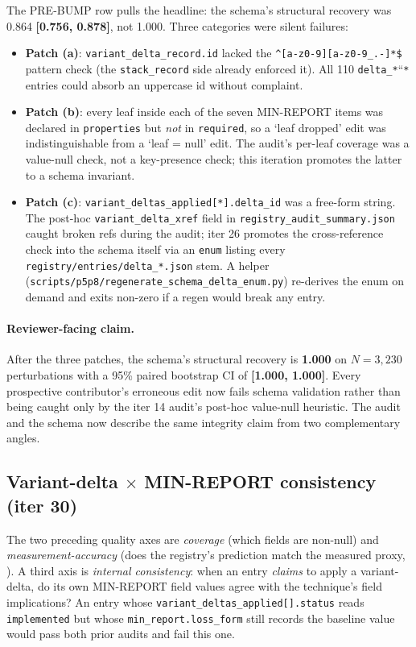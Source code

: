 The PRE-BUMP row pulls the headline: the schema's structural
recovery was 0.864 \textbf{[0.756, 0.878]}, not 1.000. Three
categories were silent failures:

\begin{itemize}
\item \textbf{Patch (a)}: \texttt{variant\_delta\_record.id} lacked
the \verb|^[a-z0-9][a-z0-9_.-]*$| pattern check (the
\texttt{stack\_record} side already enforced it). All 110
\texttt{delta\_*}``\texttt{*} entries could absorb an uppercase id
without complaint.
\item \textbf{Patch (b)}: every leaf inside each of the seven
MIN-REPORT items was declared in \texttt{properties} but \emph{not} in
\texttt{required}, so a `leaf dropped' edit was indistinguishable from
a `leaf = null' edit. The audit's per-leaf coverage was a value-null
check, not a key-presence check; this iteration promotes the latter to a
schema invariant.
\item \textbf{Patch (c)}:
\texttt{variant\_deltas\_applied[*].delta\_id} was a free-form string.
The post-hoc \texttt{variant\_delta\_xref} field in
\texttt{registry\_audit\_summary.json} caught broken refs during the
audit; iter 26 promotes the cross-reference check into the schema
itself via an \texttt{enum} listing every
\texttt{registry/entries/delta\_*.json} stem. A helper
(\texttt{scripts/p5p8/regenerate\_schema\_delta\_enum.py}) re-derives
the enum on demand and exits non-zero if a regen would break any entry.
\end{itemize}

\paragraph{Reviewer-facing claim.} After the three patches, the
schema's structural recovery is \textbf{1.000} on $N=3{,}230$
perturbations with a 95\% paired bootstrap CI of \textbf{[1.000, 1.000]}.
Every prospective contributor's erroneous edit now fails schema
validation rather than being caught only by the iter 14 audit's
post-hoc value-null heuristic. The audit and the schema now describe
the same integrity claim from two complementary angles.

\subsection{Variant-delta $\times$ MIN-REPORT consistency (iter 30)}
\label{sec:p6-delta-consistency}

The two preceding quality axes are \emph{coverage} (which fields are
non-null) and \emph{measurement-accuracy} (does the registry's
prediction match the measured proxy, ).
A third axis is \emph{internal consistency}: when an entry
\emph{claims} to apply a variant-delta, do its own MIN-REPORT field
values agree with the technique's field implications? An entry whose
\texttt{variant\_deltas\_applied[].status} reads \texttt{implemented}
but whose \texttt{min\_report.loss\_form} still records the baseline
value would pass both prior audits and fail this one.


